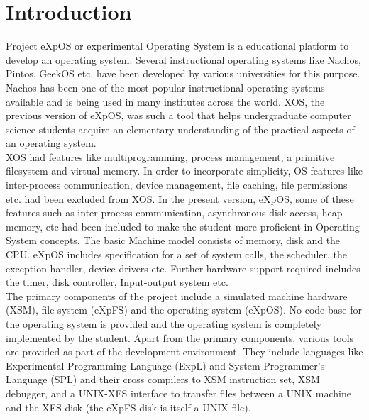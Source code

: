 \chapter{Introduction}
\label{chap2}

Project eXpOS or experimental Operating System is a educational platform to develop an operating system. Several instructional operating systems like Nachos, Pintos, GeekOS etc. have been developed by various universities for this purpose.
Nachos has been one of the most popular instructional operating systems available and is being used in many institutes across the world. XOS, the previous version of eXpOS, was such a tool that helps undergraduate computer science students acquire an elementary understanding of the practical aspects of an operating system.
\\

XOS had features like multiprogramming, process management, a primitive filesystem and virtual memory. In order to incorporate simplicity, OS features like inter-process communication, device management, file caching, file permissions etc. had been excluded from XOS. In the present version, eXpOS, some of these features such as inter process communication, asynchronous disk access, heap memory, etc had been included to make the student more proficient in Operating System concepts. The basic Machine model consists of memory, disk and the CPU. eXpOS includes specification for a set of system calls, the scheduler, the exception handler, device drivers etc.  Further hardware support required includes the timer, disk controller, Input-output system etc.
\\

The primary components of the project include a simulated machine hardware (XSM), file system (eXpFS) and the operating system (eXpOS). No code base for the operating system is provided and the operating system is completely implemented by the student. Apart from the primary components, various tools are provided as part of the development environment. They include languages like Experimental Programming Language (ExpL) and System Programmer's Language (SPL) and their cross compilers to XSM instruction set, XSM debugger, and a UNIX-XFS interface to transfer files between a UNIX machine and the XFS disk (the eXpFS disk is itself a UNIX file). 

